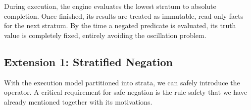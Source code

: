During execution, the engine evaluates the lowest stratum to absolute completion. 
Once finished, its results are treated as immutable, read-only facts for the next stratum. 
By the time a negated predicate is evaluated, its truth value is completely fixed, entirely avoiding the oscillation problem.

\subsection{Extension 1: Stratified Negation}

With the execution model partitioned into strata, we can safely introduce the  operator. A critical requirement for safe negation is the rule safety that we have already mentioned together with its motivations.

